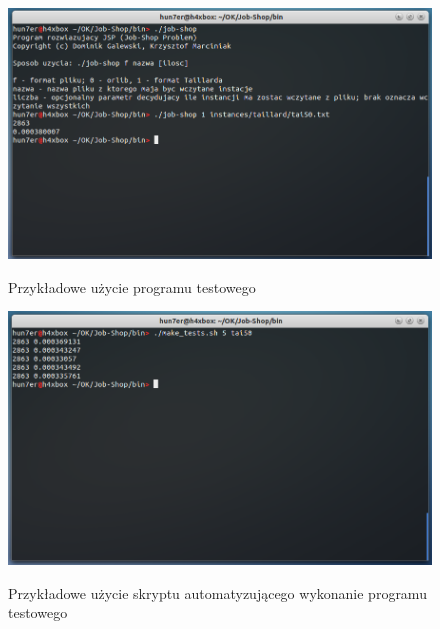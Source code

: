 \documentclass[a4paper,11pt]{article}
\begin{document}
\begin{figure}[!h]
\begin{center}
\includegraphics[scale=0.40]{images/uzycie1.png} \\
\end {center}
\caption{Przykładowe użycie programu testowego}
\end{figure}

\begin{figure}[!h]
\begin{center}
\includegraphics[scale=0.40]{images/uzycie2.png} \\
\end {center}
\caption{Przykładowe użycie skryptu automatyzującego wykonanie programu testowego}
\end{figure}
\end{document}
